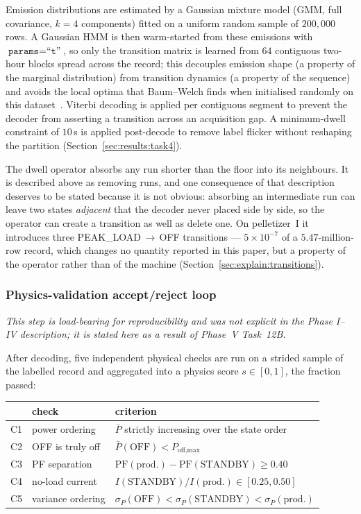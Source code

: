 Emission distributions are estimated by a Gaussian mixture model
(GMM, full covariance, $k = 4$ components) fitted on a uniform
random sample of $200{,}000$ rows.  A Gaussian HMM is then
warm-started from these emissions with $\texttt{params}=\texttt{``t''}$,
so only the transition matrix is learned from $64$ contiguous
two-hour blocks spread across the record; this decouples emission
shape (a property of the marginal distribution) from transition
dynamics (a property of the sequence) and avoids the local optima
that Baum--Welch finds when initialised randomly on this
dataset~\cite{fox2011sticky}.  Viterbi decoding is applied per
contiguous segment to prevent the decoder from asserting a transition
across an acquisition gap.  A minimum-dwell constraint of $10$\,s
is applied post-decode to remove label flicker without reshaping
the partition (Section~\ref{sec:results:task4}).

The dwell operator absorbs any run shorter than the floor into its
neighbours.  It is described above as removing runs, and one
consequence of that description deserves to be stated because it is
not obvious: absorbing an intermediate run can leave two states
\emph{adjacent} that the decoder never placed side by side, so the
operator can create a transition as well as delete one.  On
pelletizer~I it introduces three PEAK\_LOAD\,$\rightarrow$\,OFF
transitions --- $5\times10^{-7}$ of a $5.47$-million-row record, which
changes no quantity reported in this paper, but a property of the
operator rather than of the machine
(Section~\ref{sec:explain:transitions}).

\subsubsection{Physics-validation accept/reject loop}
\label{sec:method:accept_reject}

\emph{This step is load-bearing for reproducibility and was not
explicit in the Phase I--IV description; it is stated here as a
result of Phase~V Task~12B.}

After decoding, five independent physical checks are run on a
strided sample of the labelled record and aggregated into a physics
score $s\in[0,1]$, the fraction passed:

\begin{center}
\small
\begin{tabular}{@{}lll@{}}
\toprule
 & check & criterion \\
\midrule
C1 & power ordering       & $\bar{P}$ strictly increasing over the state order \\
C2 & OFF is truly off     & $\bar{P}(\text{OFF}) < P_{\text{off,max}}$ \\
C3 & PF separation        & $\mathrm{PF}(\text{prod.}) - \mathrm{PF}(\text{STANDBY}) \ge 0.40$ \\
C4 & no-load current      & $I(\text{STANDBY})/I(\text{prod.}) \in [0.25,0.50]$ \\
C5 & variance ordering    & $\sigma_P(\text{OFF}) < \sigma_P(\text{STANDBY}) < \sigma_P(\text{prod.})$ \\
\bottomrule
\end{tabular}
\end{center}

